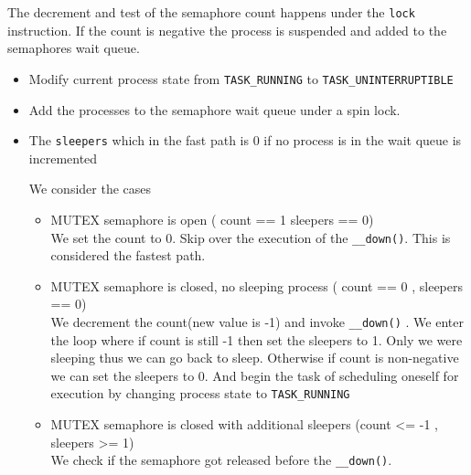 \documentclass{article}
\begin{document}
The decrement and test of the semaphore count happens under the
\lstinline{lock} instruction. If the count is negative the process is
suspended and added to the semaphores wait queue.

\begin{itemize}


  \item Modify current process state from \lstinline{TASK_RUNNING} to
    \lstinline{TASK_UNINTERRUPTIBLE}

  \item Add the processes to the semaphore wait queue under a spin
    lock.
    
  \item The \lstinline{sleepers} which in the fast path is 0 if no
    process is in the wait queue is incremented
    
    We consider the cases
    \begin{itemize}
    \item MUTEX semaphore is open ( count == 1 sleepers == 0) \\
      
      We set the count to 0. Skip over the execution of the
      \lstinline{__down()}. This is considered the fastest path.

    \item MUTEX semaphore is closed, no sleeping process
      ( count == 0 , sleepers == 0) \\

      We decrement the count(new value is -1) and invoke
      \lstinline{__down()} . We enter the loop where if count is still
      -1 then set the sleepers to 1. Only we were sleeping thus we can
      go back to sleep. Otherwise if count is non-negative we can set
      the sleepers to 0. And begin the task of scheduling oneself for
      execution by changing process state to \lstinline{TASK_RUNNING}

    \item MUTEX semaphore is closed with additional sleepers
      (count  <= -1 , sleepers >= 1) \\
      
      We check if the semaphore got released before the
      \lstinline{__down()}.

      
      
    \end{itemize}
\end{itemize}



\end{document}
